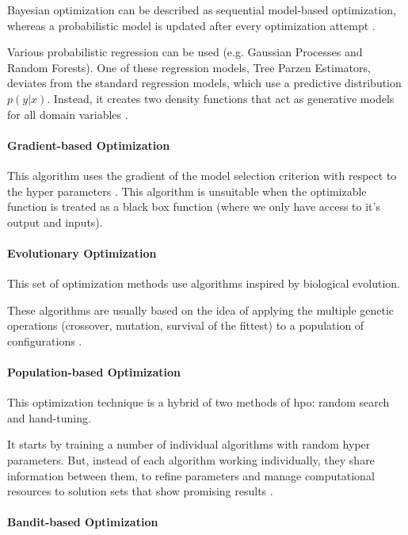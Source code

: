 Bayesian optimization can be described as sequential model-based optimization, whereas a probabilistic model is updated after every optimization attempt \parencite{dewancker}.

Various probabilistic regression can be used (e.g. Gaussian Processes and Random Forests). One of these regression models, Tree Parzen Estimators, deviates from the standard regression models, which use a predictive distribution $p(y|x)$. Instead, it creates two density functions that act as generative models for all domain variables \parencite{NIPS2011_86e8f7ab}\parencite{elshawi2019automated}.

\paragraph{Gradient-based Optimization}

This algorithm uses the gradient of the model selection criterion with respect to the hyper parameters \parencite{bengio2000}. This algorithm is unsuitable when the optimizable function is treated as a black box function (where we only have access to  it's output and inputs).


\paragraph{Evolutionary Optimization}

This set of optimization methods use algorithms inspired by biological evolution.

These algorithms are usually based on the idea of applying the multiple genetic operations (crossover, mutation, survival of the fittest) to a population of configurations \parencite{elshawi2019automated}.

\paragraph{Population-based Optimization}

This optimization technique is a hybrid of two methods of \acrshort{hpo}: random search and hand-tuning.

It starts by training a number of individual algorithms with random hyper parameters. But, instead of each algorithm working individually, they share information between them, to refine parameters and manage computational resources to solution sets that show promising results \parencite{jaderberg2017population}.

\paragraph{Bandit-based Optimization}

